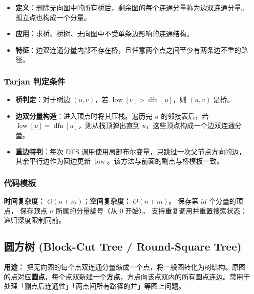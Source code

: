 \begin{itemize}
  \item \textbf{定义}：删除无向图中的所有桥后，剩余图的每个连通分量称为边双连通分量。孤立点也构成一个分量。
  \item \textbf{应用}：求桥、桥树、无向图中不受单条边影响的连通结构。
  \item \textbf{特征}：边双连通分量内部不存在桥，且任意两个点之间至少有两条边不重的路径。
\end{itemize}

\subsubsection{Tarjan 判定条件}

\begin{itemize}
  \item \textbf{桥判定}：对于树边 $(u, v)$，若 $\operatorname{low}[v] > \operatorname{dfn}[u]$，则 $(u, v)$ 是桥。
  \item \textbf{边双分量构造}：进入顶点时将其压栈。遍历完 $u$ 的邻接表后，若 $\operatorname{low}[u] = \operatorname{dfn}[u]$，则从栈顶弹出直到 $u$，这些顶点构成一个边双连通分量。
  \item \textbf{重边特判}：每次 DFS 调用使用局部布尔变量，只跳过一次父节点方向的边，其余平行边作为回边更新 $\operatorname{low}$。该方法与前面的割点与桥模板一致。
\end{itemize}

\subsubsection{代码模板}

\textbf{时间复杂度：} $O(n+m)$；\textbf{空间复杂度：} $O(n+m)$。 保存第 $id$ 个分量的顶点， 保存顶点 $u$ 所属的分量编号（从 $0$ 开始）。 支持重复调用并重置搜索状态；递归深度限制同前。



\subsection{圆方树 (Block-Cut Tree / Round-Square Tree)}

\textbf{用途：} 把无向图的每个点双连通分量缩成一个点，将一般图转化为树结构。原图的点对应\textbf{圆点}，每个点双新建一个\textbf{方点}，方点向该点双内的所有圆点连边。常用于处理「删点后连通性」「两点间所有路径的并」等图上问题。

